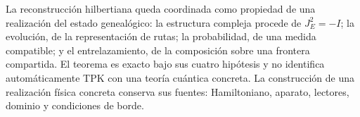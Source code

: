 \begin{statusbox}[title={Resultado y alcance}]
La reconstrucción hilbertiana queda coordinada como propiedad de una
realización del estado genealógico: la estructura compleja procede de
\(J_E^2=-I\); la evolución, de la representación de rutas; la probabilidad,
de una medida compatible; y el entrelazamiento, de la composición sobre una
frontera compartida. El teorema es exacto bajo sus cuatro hipótesis y no
identifica automáticamente TPK con una teoría cuántica concreta. La
construcción de una realización física concreta conserva sus fuentes:
Hamiltoniano, aparato, lectores, dominio y condiciones de borde.
\end{statusbox}

